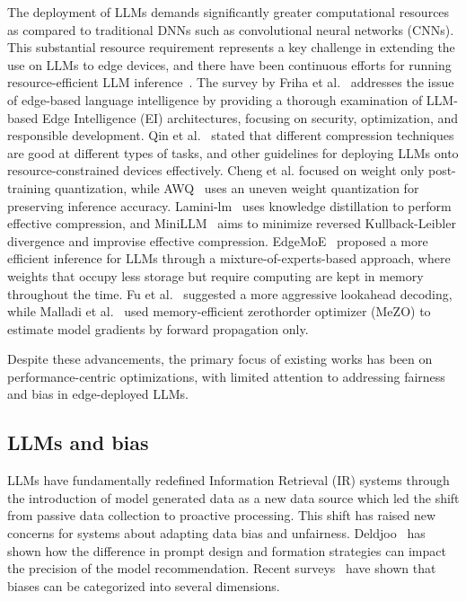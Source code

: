 The deployment of LLMs demands significantly greater computational resources as compared to traditional DNNs such as convolutional neural networks (CNNs). 
This substantial resource requirement represents a key challenge in extending the use on LLMs to edge devices, and there have been continuous efforts for running resource-efficient LLM inference~\cite{haris_SECDA-LLM_2024}. 
The survey by Friha et al.~\cite{04} addresses the issue of edge-based language intelligence by providing a thorough examination of LLM-based Edge Intelligence (EI) architectures, focusing on security, optimization, and responsible development. 
Qin et al.~\cite{qin2024empirical} stated that different compression techniques are good at different types of tasks, and other guidelines for deploying LLMs onto resource-constrained devices effectively.  
Cheng et al.\cite{cheng2023optimize} focused on weight only post-training quantization, while AWQ~\cite{lin2024awq} uses an uneven weight quantization for preserving inference accuracy. Lamini-lm~\cite{wu2023lamini} uses knowledge distillation to perform effective compression, and MiniLLM~\cite{gu2024minillm} aims to minimize reversed Kullback-Leibler divergence and improvise effective compression.
EdgeMoE~\cite{yi2023edgemoe} proposed a more efficient inference for LLMs through a mixture-of-experts-based approach, where weights that occupy less storage but require computing are kept in memory throughout the time. Fu et al.~\cite{fu2024break} suggested a more aggressive lookahead decoding, while Malladi et al.~\cite{malladi2023fine} used memory-efficient zerothorder optimizer (MeZO) to estimate model gradients by forward propagation only. 

Despite these advancements, the primary focus of existing works has been on performance-centric optimizations, with limited attention to addressing fairness and bias in edge-deployed LLMs. 



\subsection{LLMs and bias}

LLMs have fundamentally redefined Information Retrieval (IR) systems through the introduction of model generated data as a new data source which led the shift from passive data collection to proactive processing. 
This shift has raised new concerns for systems about adapting data bias and unfairness. Deldjoo~\cite{deldjoo2024understandingbiaseschatgptbasedrecommender} has shown how the difference in prompt design and formation strategies can impact the precision of the model recommendation. 
Recent surveys~\cite{amigo2023unifying,deldjoo2024fairness} have shown that biases can be categorized into several dimensions. 

